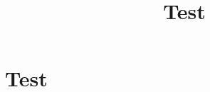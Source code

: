\documentclass{article}
\begin{document}
\title{Test}
\author{}
\date{}
\maketitle
\section{Test}
\end{document}

